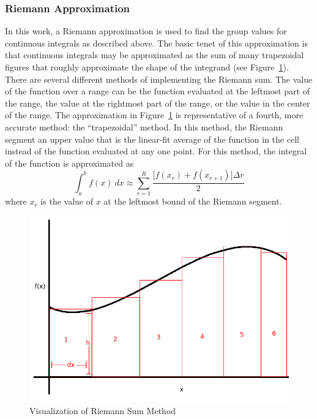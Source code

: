 \subsubsection{Riemann Approximation}
In this work, a Riemann approximation is used to find the group values for
continuous integrals as described above.  The basic tenet of this approximation
is that continuous integrals may be approximated as the sum of many trapezoidal
figures that roughly approximate the shape of the integrand (see Figure\
\ref{RiemannFig}).  There are several different methods of implementing the
Riemann sum.  The value of the function over a range can be the function
evaluated at the leftmost part of the range, the value at the rightmost part
of the range, or the value in the center of the range.  The approximation in
Figure\ \ref{RiemannFig} is representative of a fourth, more
accurate method: the ``trapezoidal'' method.  In this method, the Riemann
segment an upper value that is the linear-fit average of the function in the
cell instead of the function evaluated at any one point. For this method, the
integral of the function is approximated as
\[\int_a^b f(x)\ dx \approx \sum_{r=1}^R \frac{\big[f(x_r)+f(x_{r+1})\big]
  \Delta r}{2}\]
where $x_r$ is the value of $x$ at the leftmost bound of the Riemann segment.
\begin{figure}[htb]
\centering
\includegraphics[width=0.7\linewidth]{graphics/RiemannFig}
\caption{Visualization of Riemann Sum Method}
\label{RiemannFig}
\end{figure}

\newpage
